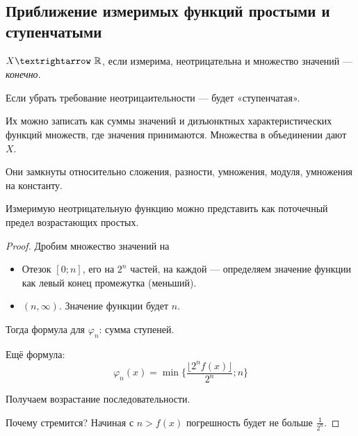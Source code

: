 \documentclass[12pt, a4paper, oneside]{memoir}
\begin{document}
\subsection{Приближение измеримых функций простыми и ступенчатыми}

\begin{definition}

    $X → \sR$, если измерима, неотрицательна и множество значений — \textit{конечно}.
\end{definition}

Если убрать требование неотрицаительности — будет «ступенчатая».

Их можно записать как суммы значений и 
дизъюнктных характеристических функций множеств, где значения принимаются.
Множества в объединении дают $X$.

\begin{remark}
    Они замкнуты относительно сложения, разности, умножения, модуля, умножения на константу.
\end{remark}


\begin{theorem}

    Измеримую неотрицательную функцию можно представить
    как поточечный предел возрастающих простых.

    \begin{proof}
        Дробим множество значений на
        \begin{itemize}
            \item Отезок $[0; n]$, его на $2^n$ частей, на каждой — 
            определяем значение функции как левый конец промежутка (меньший).
            \item $(n, \infty)$. Значение функции будет $n$.
        \end{itemize}

        Тогда формула для $\varphi_n$: сумма ступеней.


        Ещё формула:
        \begin{equation}
            \varphi_n(x) = \min \{\frac{\lfloor 2^n f(x) \rfloor}{2^n} ; n \}
        \end{equation}

        Получаем возрастание последовательности.

        Почему стремится? Начиная с $n > f(x)$ погрешность будет не больше $\frac{1}{2^n}$.
    \end{proof}
\end{theorem}
\end{document}
